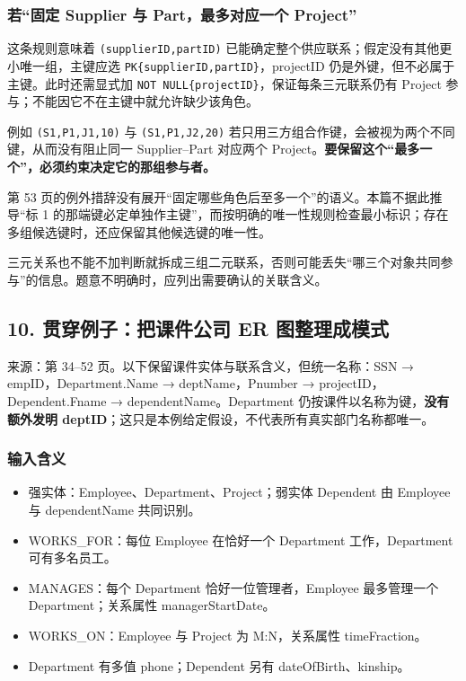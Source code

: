 \subsubsection{若``固定 Supplier 与 Part，最多对应一个 Project''}\label{04_er_to_relational_mapping_zh-ux82e5ux56faux5b9a-supplier-ux4e0e-partux6700ux591aux5bf9ux5e94ux4e00ux4e2a-project}

这条规则意味着 \texttt{(\allowbreak{}supplierID,\allowbreak{}partID)\allowbreak{}} 已能确定整个供应联系；假定没有其他更小唯一组，主键应选 \texttt{PK\{supplierID,partID\}}，projectID 仍是外键，但不必属于主键。此时还需显式加 \texttt{NOT\ NULL\{projectID\}}，保证每条三元联系仍有 Project 参与；不能因它不在主键中就允许缺少该角色。

例如 \texttt{(\allowbreak{}S1,\allowbreak{}P1,\allowbreak{}J1,\allowbreak{}10)\allowbreak{}} 与 \texttt{(\allowbreak{}S1,\allowbreak{}P1,\allowbreak{}J2,\allowbreak{}20)\allowbreak{}} 若只用三方组合作键，会被视为两个不同键，从而没有阻止同一 Supplier--Part 对应两个 Project。\textbf{要保留这个``最多一个''，必须约束决定它的那组参与者。}

第 53 页的例外措辞没有展开``固定哪些角色后至多一个''的语义。本篇不据此推导``标 1 的那端键必定单独作主键''，而按明确的唯一性规则检查最小标识；存在多组候选键时，还应保留其他候选键的唯一性。

三元关系也不能不加判断就拆成三组二元联系，否则可能丢失``哪三个对象共同参与''的信息。题意不明确时，应列出需要确认的关联含义。

\subsection{10. 贯穿例子：把课件公司 ER 图整理成模式}\label{04_er_to_relational_mapping_zh-ux8d2fux7a7fux4f8bux5b50ux628aux8bfeux4ef6ux516cux53f8-er-ux56feux6574ux7406ux6210ux6a21ux5f0f}

来源：第 34--52 页。以下保留课件实体与联系含义，但统一名称：SSN → empID，Department.Name → deptName，Pnumber → projectID，Dependent.Fname → dependentName。Department 仍按课件以名称为键，\textbf{没有额外发明 deptID}；这只是本例给定假设，不代表所有真实部门名称都唯一。

\subsubsection{输入含义}\label{04_er_to_relational_mapping_zh-ux8f93ux5165ux542bux4e49}

\begin{itemize}
\tightlist
\item
  强实体：Employee、Department、Project；弱实体 Dependent 由 Employee 与 dependentName 共同识别。
\item
  WORKS\_FOR：每位 Employee 在恰好一个 Department 工作，Department 可有多名员工。
\item
  MANAGES：每个 Department 恰好一位管理者，Employee 最多管理一个 Department；关系属性 managerStartDate。
\item
  WORKS\_ON：Employee 与 Project 为 M:N，关系属性 timeFraction。
\item
  Department 有多值 phone；Dependent 另有 dateOfBirth、kinship。
\end{itemize}

